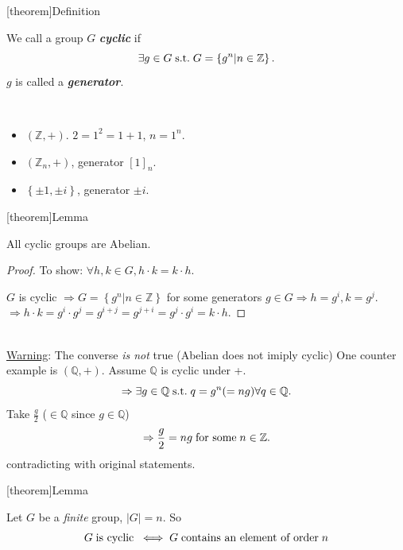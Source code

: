 \documentclass[12pt]{report}
\theoremstyle{definition}
\begin{document}
[theorem]{Definition}
\begin{cyclic group}
    We call a group $G$ \textbf{\emph{cyclic}} if \[
        \exists g \in G \;\textnormal{s.t.}\; G = \left\{g^{n} | n \in \mathbb{Z}\right\}%
.\]
    $g$ is called a \textbf{\emph{generator}}.
\end{cyclic group}

\begin{ex}
    \,

    \begin{itemize}
        \item $(\mathbb{Z}, +)$.
            $2 = 1^{2} = 1 + 1$, $n = 1^{n}$.
        \item $(\mathbb{Z}_n, +)$, generator ${[1]}_{n}$.
        \item $\left\{\pm 1, \pm i\right\} $, generator $\pm i$.
    \end{itemize}
    
\end{ex}

[theorem]{Lemma}
\begin{cyclic groups are Abelian}
    All cyclic groups are Abelian.
\end{cyclic groups are Abelian}

\begin{proof}
    To show: $\forall h, k \in G, h \cdot k = k \cdot h$.

    $G$ is cyclic 
    $\Rightarrow{} G = \left\{g^{n} | n \in{}\mathbb{Z}\right\} $
    for some generators $g \in G \Rightarrow h = g^{i}, k = g^{j}$.
    \\$\Rightarrow{} h \cdot k = g^{i} \cdot g^{j} = g^{i + j} = g^{j + i} = g^{j} \cdot g^{i} = k \cdot h$.
\end{proof}
\\\underline{Warning}: The converse \emph{is not} true (Abelian does not imiply cyclic)
One counter example is $ (\mathbb{Q}, +)$.
Assume $\mathbb{Q}$ is cyclic under +. \[
    \Rightarrow \exists g \in \mathbb{Q} \;\textnormal{s.t.}\; q = g^{n} (= ng) \forall q \in \mathbb{Q}.
\]
Take $\frac{g}{2}$ ($\in \mathbb{Q}$ since $g \in \mathbb{Q}$)\[
    \Rightarrow \frac{g}{2} = ng \;\textnormal{for some}\; n \in \mathbb{Z}.
\]contradicting with original statements.

[theorem]{Lemma}
\begin{G has element of order n}
    Let $G$ be a \emph{finite} group, $|G| = n$. So \[
        G \;\textnormal{is cyclic}\; \iff G \;\textnormal{contains an element of order}\; n
    \]
\end{G has element of order n}
\end{document}
